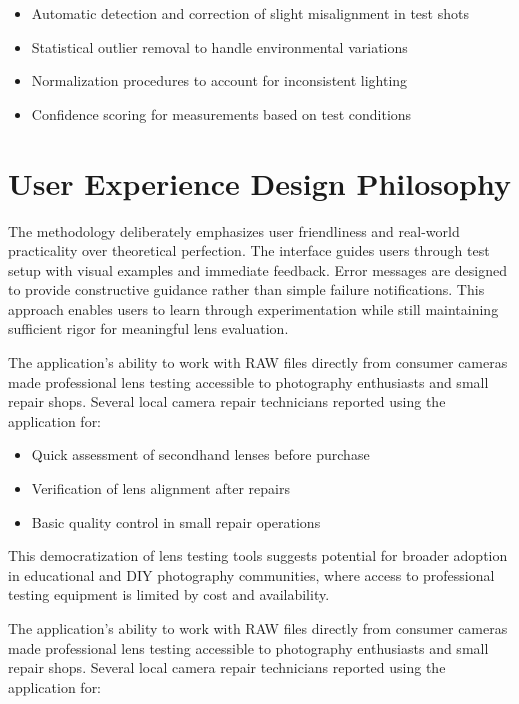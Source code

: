 \begin{itemize}
    \item Automatic detection and correction of slight misalignment in test shots
    \item Statistical outlier removal to handle environmental variations
    \item Normalization procedures to account for inconsistent lighting
    \item Confidence scoring for measurements based on test conditions
\end{itemize}

\section{User Experience Design Philosophy}

The methodology deliberately emphasizes user friendliness and real-world practicality over theoretical perfection. The interface guides users through test setup with visual examples and immediate feedback. Error messages are designed to provide constructive guidance rather than simple failure notifications. This approach enables users to learn through experimentation while still maintaining sufficient rigor for meaningful lens evaluation.



The application's ability to work with RAW files directly from consumer cameras made professional lens testing accessible to photography enthusiasts and small repair shops. Several local camera repair technicians reported using the application for:

\begin{itemize}
    \item Quick assessment of secondhand lenses before purchase
    \item Verification of lens alignment after repairs
    \item Basic quality control in small repair operations
\end{itemize}

This democratization of lens testing tools suggests potential for broader adoption in educational and DIY photography communities, where access to professional testing equipment is limited by cost and availability.



The application's ability to work with RAW files directly from consumer cameras made professional lens testing accessible to photography enthusiasts and small repair shops. Several local camera repair technicians reported using the application for:

